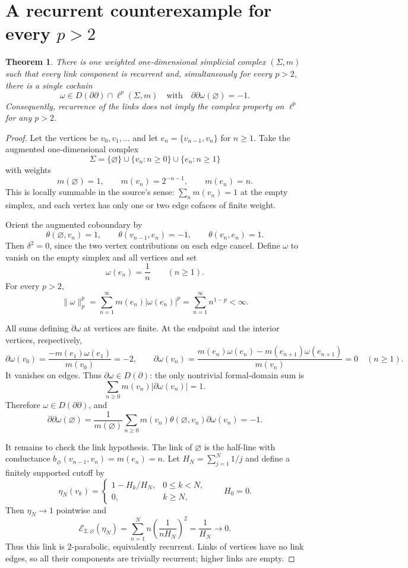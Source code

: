 \documentclass[11pt,a4paper]{article}
\newtheorem{theorem}{Theorem}
\newcommand{\E}{\mathcal E}
\begin{document}
\section{A recurrent counterexample for every \texorpdfstring{$p>2$}{p greater than 2}}

\begin{theorem}\label{thm:counterexample}
There is one weighted one-dimensional simplicial complex $(\Sigma,m)$ such that every link component is recurrent and, simultaneously for every $p>2$, there is a single cochain
\[
 \omega\in D(\partial\partial)\cap\ell^p(\Sigma,m)
 \quad\text{with}\quad
 \partial\partial\omega(\varnothing)=-1.
\]
Consequently, recurrence of the links does not imply the complex property on $\ell^p$ for any $p>2$.
\end{theorem}

\begin{proof}
Let the vertices be $v_0,v_1,\ldots$ and let
$e_n=\{v_{n-1},v_n\}$ for $n\geq1$. Take the augmented one-dimensional complex
\[
 \Sigma=\{\varnothing\}\cup\{v_n:n\geq0\}
       \cup\{e_n:n\geq1\}
\]
with weights
\[
 m(\varnothing)=1,
 \qquad m(v_n)=2^{-n-1},
 \qquad m(e_n)=n.
\]
This is locally summable in the source's sense: $\sum_n m(v_n)=1$ at the empty simplex, and each vertex has only one or two edge cofaces of finite weight.

Orient the augmented coboundary by
\[
 \theta(\varnothing,v_n)=1,
 \qquad \theta(v_{n-1},e_n)=-1,
 \qquad \theta(v_n,e_n)=1.
\]
Then $\delta^2=0$, since the two vertex contributions on each edge cancel. Define $\omega$ to vanish on the empty simplex and all vertices and set
\[
 \omega(e_n)=\frac1n\qquad(n\geq1).
\]
For every $p>2$,
\[
 \|\omega\|_p^p
 =\sum_{n=1}^\infty m(e_n)|\omega(e_n)|^p
 =\sum_{n=1}^\infty n^{1-p}<\infty.
\]

All sums defining $\partial\omega$ at vertices are finite. At the endpoint and the interior vertices, respectively,
\[
 \partial\omega(v_0)
 =\frac{-m(e_1)\omega(e_1)}{m(v_0)}=-2,
 \qquad
 \partial\omega(v_n)
 =\frac{m(e_n)\omega(e_n)-m(e_{n+1})\omega(e_{n+1})}{m(v_n)}=0
 \quad(n\geq1).
\]
It vanishes on edges. Thus $\partial\omega\in D(\partial)$: the only nontrivial formal-domain sum is
\[
 \sum_{n\geq0}m(v_n)|\partial\omega(v_n)|=1.
\]
Therefore $\omega\in D(\partial\partial)$, and
\[
 \partial\partial\omega(\varnothing)
 =\frac1{m(\varnothing)}
   \sum_{n\geq0}m(v_n)\theta(\varnothing,v_n)
          \partial\omega(v_n)=-1.
\]

It remains to check the link hypothesis. The link of $\varnothing$ is the half-line with conductance
$b_\varnothing(v_{n-1},v_n)=m(e_n)=n$. Let $H_N=\sum_{j=1}^N1/j$ and define a finitely supported cutoff by
\[
 \eta_N(v_k)=
 \begin{cases}
  1-H_k/H_N,&0\leq k<N,\\
  0,&k\geq N,
 \end{cases}
 \qquad H_0=0.
\]
Then $\eta_N\to1$ pointwise and
\[
 \E_{2,\varnothing}(\eta_N)
 =\sum_{n=1}^N n\left(\frac1{nH_N}\right)^2
 =\frac1{H_N}\longrightarrow0.
\]
Thus this link is $2$-parabolic, equivalently recurrent. Links of vertices have no link edges, so all their components are trivially recurrent; higher links are empty.


\end{proof}
\end{document}
